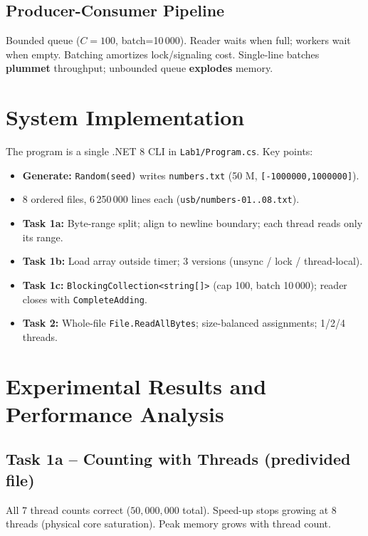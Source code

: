 \documentclass[12pt,a4paper]{article}
\begin{document}
\subsection{Producer-Consumer Pipeline}
Bounded queue ($C=100$, batch=10\,000). Reader waits when full; workers wait when empty. Batching amortizes lock/signaling cost. Single-line batches \textbf{plummet} throughput; unbounded queue \textbf{explodes} memory.

\section{System Implementation}
The program is a single .NET 8 CLI in \texttt{Lab1/Program.cs}. Key points:
\begin{itemize}
    \item \textbf{Generate:} \texttt{Random(seed)} writes \texttt{numbers.txt} (50 M, \texttt{[-1000000,1000000]}).
    \item {} 8 ordered files, 6\,250\,000 lines each (\texttt{usb/numbers-01..08.txt}).
    \item \textbf{Task 1a:} Byte-range split; align to newline boundary; each thread reads only its range.
    \item \textbf{Task 1b:} Load array outside timer; 3 versions (unsync / lock / thread-local).
    \item \textbf{Task 1c:} \texttt{BlockingCollection<string[]>} (cap 100, batch 10\,000); reader closes with \texttt{CompleteAdding}.
    \item \textbf{Task 2:} Whole-file \texttt{File.ReadAllBytes}; size-balanced assignments; 1/2/4 threads.
\end{itemize}

\section{Experimental Results and Performance Analysis}
\label{sec:results}

\subsection{Task 1a -- Counting with Threads (predivided file)}
All 7 thread counts correct ($50{,}000{,}000$ total). Speed-up stops growing at 8 threads (physical core saturation). Peak memory grows with thread count.
\end{document}

